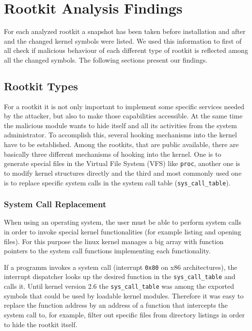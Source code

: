 \section{Rootkit Analysis Findings}
\label{rootkit_analysis}
For each analyzed rootkit a snapshot has been taken before installation and after and the changed kernel symbols were listed.
We used this information to first of all check if
malicious behaviour of each different type of rootkit is reflected among all the changed symbols.
The following sections present our findings.

\subsection{Rootkit Types}
For a rootkit it is not only important to implement some specific services needed by the attacker, but 
also to make those capabilities accessible. At the same time the malicious module wants to hide itself 
and all its activities from the system administrator. To accomplish this, several hooking mechanisms 
into the kernel have to be established. Among the rootkits, that are public available, there are basically 
three different mechanisms of hooking into the kernel. One is to generate special files in the 
Virtual File System (VFS) like \texttt{proc}, another one is to modify kernel structures directly and 
the third and most commonly used one is to replace specific system calls in the system call table (\texttt{sys\_call\_table}).	

\subsubsection{System Call Replacement}
\label{system_call_replacement}
When using an operating system, 
the user must be able to perform system calls in order to invoke special kernel functionalities (for example listing 
and opening files). For this purpose the linux kernel manages a big array with function pointers to the system call 
functions implementing each functionality. 

If a programm invokes a system call (interrupt \texttt{0x80} on x86 architectures), the interrupt dispatcher looks up 
the desired function in the \texttt{sys\_call\_table} and calls it. Until kernel version 2.6 the \texttt{sys\_call\_table} 
was among the exported symbols that could be used by loadable kernel modules. Therefore it was easy to replace the 
function address by an address of a function that intercepts the system call to, for example, filter out specific 
files from directory listings in order to hide the rootkit itself. 

